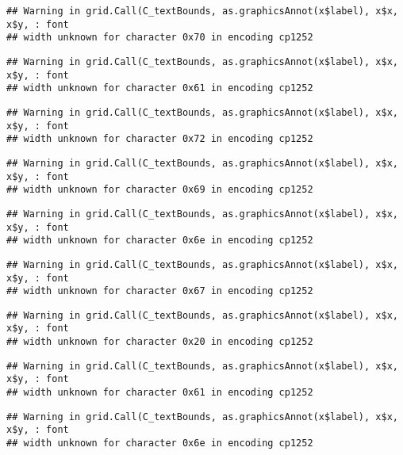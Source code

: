 \documentclass[
]{article}
\begin{document}
\begin{verbatim}
## Warning in grid.Call(C_textBounds, as.graphicsAnnot(x$label), x$x, x$y, : font
## width unknown for character 0x70 in encoding cp1252
\end{verbatim}

\begin{verbatim}
## Warning in grid.Call(C_textBounds, as.graphicsAnnot(x$label), x$x, x$y, : font
## width unknown for character 0x61 in encoding cp1252
\end{verbatim}

\begin{verbatim}
## Warning in grid.Call(C_textBounds, as.graphicsAnnot(x$label), x$x, x$y, : font
## width unknown for character 0x72 in encoding cp1252
\end{verbatim}

\begin{verbatim}
## Warning in grid.Call(C_textBounds, as.graphicsAnnot(x$label), x$x, x$y, : font
## width unknown for character 0x69 in encoding cp1252
\end{verbatim}

\begin{verbatim}
## Warning in grid.Call(C_textBounds, as.graphicsAnnot(x$label), x$x, x$y, : font
## width unknown for character 0x6e in encoding cp1252
\end{verbatim}

\begin{verbatim}
## Warning in grid.Call(C_textBounds, as.graphicsAnnot(x$label), x$x, x$y, : font
## width unknown for character 0x67 in encoding cp1252
\end{verbatim}

\begin{verbatim}
## Warning in grid.Call(C_textBounds, as.graphicsAnnot(x$label), x$x, x$y, : font
## width unknown for character 0x20 in encoding cp1252
\end{verbatim}

\begin{verbatim}
## Warning in grid.Call(C_textBounds, as.graphicsAnnot(x$label), x$x, x$y, : font
## width unknown for character 0x61 in encoding cp1252
\end{verbatim}

\begin{verbatim}
## Warning in grid.Call(C_textBounds, as.graphicsAnnot(x$label), x$x, x$y, : font
## width unknown for character 0x6e in encoding cp1252
\end{verbatim}
\end{document}
